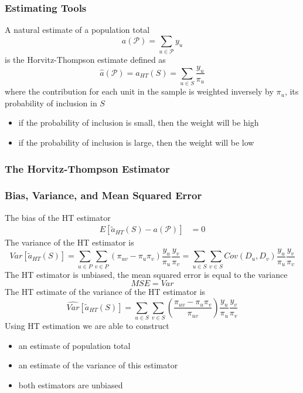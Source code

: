 \documentclass[11pt]{article}
\begin{document}
\subsubsection{Estimating Tools}
A natural estimate of a population total 
\[a(\mathcal{P}) = \sum_{u\in\mathcal{P}}y_u\]
is the Horvitz-Thompson estimate defined as 
\[\hat{a}(\mathcal{P}) = a_{HT}(S) = \sum_{u\in S}\frac{y_u}{\pi_u}\]
where the contribution for each unit in the sample is weighted inversely by $\pi_u$, its probability of inclusion in $S$
\begin{itemize}
    \item if the probability of inclusion is small, then the weight will be high
    \item if the probability of inclusion is large, then the weight will be low 
\end{itemize}
\subsubsection*{The Horvitz-Thompson Estimator}
\subsubsection*{Bias, Variance, and Mean Squared Error}
The bias of the HT estimator 
\begin{align*}
    E[\tilde{a}_{HT}(S) - a(\mathcal{P})] &= 0
\end{align*}
The variance of the HT estimator is 
\[Var[\tilde{a}_{HT}(S)] = \sum_{u\in P}\sum_{v\in P}(\pi_{uv} - \pi_u\pi_v)\frac{y_u}{\pi_u}\frac{y_v}{\pi_v} = \sum_{u\in S}\sum_{v\in S}Cov(D_u,D_v)\frac{y_u}{\pi_u}\frac{y_v}{\pi_v}\] 
The HT estimator is unbiased, the mean squared error is equal to the variance 
\[MSE = Var\]    
The HT estimate of the variance of the HT estimator is 
\[\hat{Var}[\tilde{a}_{HT}(S)] = \sum_{u\in S}\sum_{v\in S}(\frac{\pi_{uv}-\pi_u\pi_v}{\pi_{uv}})\frac{y_u}{\pi_u}\frac{y_v}{\pi_v}\]    
Using HT estimation we are able to construct 
\begin{itemize}
    \item an estimate of population total 
    \item an estimate of the variance of this estimator 
    \item both estimators are unbiased
\end{itemize}
\end{document}

